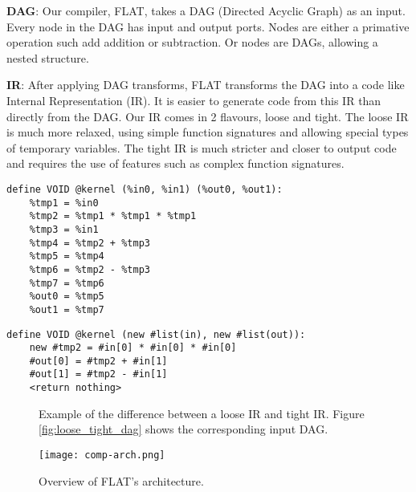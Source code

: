 \textbf{DAG}: Our compiler, FLAT, takes a DAG (Directed Acyclic Graph) as an input.
Every node in the DAG has input and output ports.
Nodes are either a primative operation such add addition or subtraction.
Or nodes are DAGs, allowing a nested structure. 

\textbf{IR}: After applying DAG transforms, FLAT transforms the DAG into a code like Internal Representation (IR).
It is easier to generate code from this IR than directly from the DAG.
Our IR comes in 2 flavours, loose and tight.
The loose IR is much more relaxed, using simple function signatures and allowing special types of temporary variables.
The tight IR is much stricter and closer to output code and requires the use of features such as complex function signatures.

\newsavebox{\looseIRlisting}
\begin{lrbox}{\looseIRlisting}%
\begin{lstlisting}
define VOID @kernel (%in0, %in1) (%out0, %out1):
	%tmp1 = %in0
	%tmp2 = %tmp1 * %tmp1 * %tmp1
	%tmp3 = %in1
	%tmp4 = %tmp2 + %tmp3
	%tmp5 = %tmp4
	%tmp6 = %tmp2 - %tmp3
	%tmp7 = %tmp6
	%out0 = %tmp5
	%out1 = %tmp7
\end{lstlisting}
\endminipage
\end{lrbox}



\newsavebox{\tightIRlisting}
\begin{lrbox}{\tightIRlisting}%
\begin{lstlisting}
define VOID @kernel (new #list(in), new #list(out)):
	new #tmp2 = #in[0] * #in[0] * #in[0]
	#out[0] = #tmp2 + #in[1]
	#out[1] = #tmp2 - #in[1]
	<return nothing>
\end{lstlisting}
\endminipage
\end{lrbox}

\begin{figure}
\centering


\usebox{\measurebox}\qquad
    \begin{minipage}[][\ht\measurebox][c]{.26\textwidth}
       
    \end{minipage}
\caption{Example of the difference between a loose IR and tight IR. Figure \ref{fig:loose_tight_dag} shows the corresponding input DAG.} 
\label{fig:tight_loose}
\end{figure}

    \begin{figure}[h!]
    \begin{center}
        \texttt{[image: comp-arch.png]}
        \caption{Overview of FLAT's architecture.}
        \label{fig:arch}
    \end{center}
\end{figure}